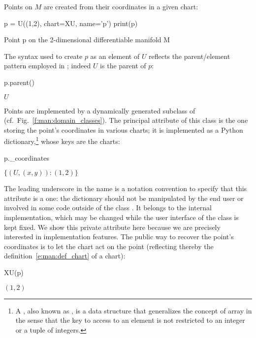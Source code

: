 Points on $M$ are created from their coordinates in a given chart:
\begin{NBin}
p = U((1,2), chart=XU, name='p')
print(p)
\end{NBin}
\begin{NBprint}
Point p on the 2-dimensional differentiable manifold M
\end{NBprint}
The syntax  used to create $p$ as an element of $U$
reflects the parent/element pattern employed in \Sage{}; indeed $U$
is the parent of $p$:
\begin{NBin}
p.parent()
\end{NBin}
\begin{NBout}
$U$
\end{NBout}
Points are implemented by a dynamically generated subclass of
 (cf.\ Fig.~\ref{f:man:domain_classes}).
The principal attribute of this class is the one storing the point's coordinates
in various charts; it is implemented as
a Python dictionary,\footnote{A ,
also known as , is a
data structure that generalizes the concept of array in the sense that the
key to access to an element is not restricted to an integer or a tuple of integers.} whose keys are the charts:
\begin{NBin}
p._coordinates
\end{NBin}
\begin{NBout}
$\{(U, (x,y)): (1,2)\}$
\end{NBout}
The leading underscore in the name  is a notation
convention to specify that this attribute is a  one:
the dictionary  should
not be manipulated by the end user or involved in some code
outside of the class .
It belongs to the internal implementation, which may be changed while
the user interface of the class  is kept fixed. We show
this private attribute here
because we are precisely interested in implementation features.
The public way to recover the point's coordinates is to let the chart act on
the point (reflecting thereby the definition~\eqref{e:man:def_chart} of a chart):
\begin{NBin}
XU(p)
\end{NBin}
\begin{NBout}
$(1,2)$
\end{NBout}

